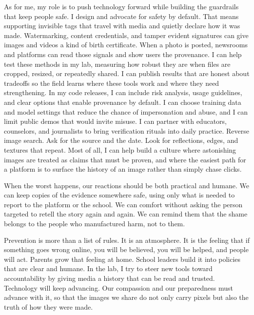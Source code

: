 \documentclass[11pt]{article}
\begin{document}
As for me, my role is to push technology forward while building the guardrails
that keep people safe. I design and advocate for safety by default. That means
supporting invisible tags that travel with media and quietly declare how it was
made. Watermarking, content credentials, and tamper evident signatures can give
images and videos a kind of birth certificate. When a photo is posted, newsrooms
and platforms can read those signals and show users the provenance. I can help
test these methods in my lab, measuring how robust they are when files are
cropped, resized, or repeatedly shared. I can publish results that are honest
about tradeoffs so the field learns where these tools work and where they need
strengthening. In my code releases, I can include risk analysis, usage
guidelines, and clear options that enable provenance by default. I can choose
training data and model settings that reduce the chance of impersonation and
abuse, and I can limit public demos that would invite misuse. I can partner with
educators, counselors, and journalists to bring verification rituals into daily
practice. Reverse image search. Ask for the source and the date. Look for
reflections, edges, and textures that repeat. Most of all, I can help build a
culture where astonishing images are treated as claims that must be proven, and
where the easiest path for a platform is to surface the history of an image
rather than simply chase clicks.

When the worst happens, our reactions should be both practical and humane. We
can keep copies of the evidence somewhere safe, using only what is needed to
report to the platform or the school. We can comfort without asking the person
targeted to retell the story again and again. We can remind them that the shame
belongs to the people who manufactured harm, not to them. 

Prevention is more than a list of rules. It is an atmosphere. It is the feeling
that if something goes wrong online, you will be believed, you will be helped,
and people will act. Parents grow that feeling at home. School leaders build it
into policies that are clear and humane. In the lab, I try to steer new tools
toward accountability by giving media a history that can be read and trusted.
Technology will keep advancing. Our compassion and our preparedness must advance
with it, so that the images we share do not only carry pixels but also the truth
of how they were made.
\end{document}
